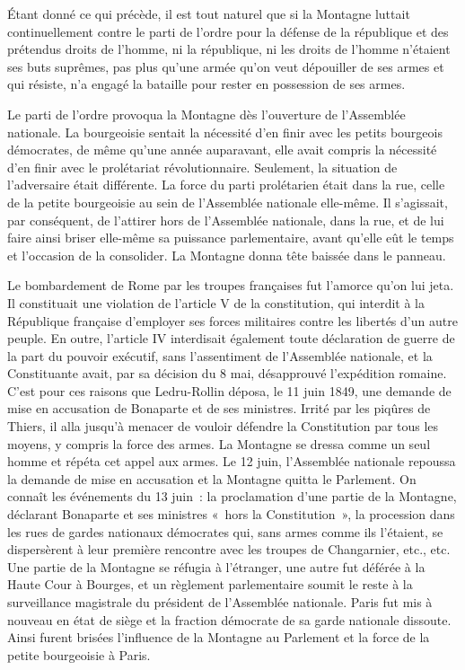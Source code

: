\documentclass[french,twoside]{book} %
\begin{document}
Étant donné ce qui précède, il est tout naturel que si la Montagne luttait continuellement contre le parti de l’ordre pour la défense de la république et des prétendus droits de l’homme, ni la république, ni les droits de l’homme n’étaient ses buts suprêmes, pas plus qu’une armée qu’on veut dépouiller de ses armes et qui résiste, n’a engagé la bataille pour rester en possession de ses armes.\par
Le parti de l’ordre provoqua la Montagne dès l’ouverture de l’Assemblée nationale. La bourgeoisie sentait la nécessité d’en finir avec les petits bourgeois démocrates, de même qu’une année auparavant, elle avait compris la nécessité d’en finir avec le prolétariat révolutionnaire. Seulement, la situation de l’adversaire était différente. La force du parti prolétarien était dans la rue, celle de la petite bourgeoisie au sein de l’Assemblée nationale elle-même. Il s’agissait, par conséquent, de l’attirer hors de l’Assemblée nationale, dans la rue, et de lui faire ainsi briser elle-même sa puissance parlementaire, avant qu’elle eût le temps et l’occasion de la consolider. La Montagne donna tête baissée dans le panneau.\par
Le bombardement de Rome par les troupes françaises fut l’amorce qu’on lui jeta. Il constituait une violation de l’article V de la constitution, qui interdit à la République française d’employer ses forces militaires contre les libertés d’un autre peuple. En outre, l’article IV interdisait également toute déclaration de guerre de la part du pouvoir exécutif, sans l’assentiment de l’Assemblée nationale, et la Constituante avait, par sa décision du 8 mai, désapprouvé l’expédition romaine. C’est pour ces raisons que Ledru-Rollin déposa, le 11 juin 1849, une demande de mise en accusation de Bonaparte et de ses ministres. Irrité par les piqûres de Thiers, il alla jusqu’à menacer de vouloir défendre la Constitution par tous les moyens, y compris la force des armes. La Montagne se dressa comme un seul homme et répéta cet appel aux armes. Le 12 juin, l’Assemblée nationale repoussa la demande de mise en accusation et la Montagne quitta le Parlement. On connaît les événements du 13 juin : la proclamation d’une partie de la Montagne, déclarant Bonaparte et ses ministres « hors la Constitution », la procession dans les rues de gardes nationaux démocrates qui, sans armes comme ils l’étaient, se dispersèrent à leur première rencontre avec les troupes de Changarnier, etc., etc. Une partie de la Montagne se réfugia à l’étranger, une autre fut déférée à la Haute Cour à Bourges, et un règlement parlementaire soumit le reste à la surveillance magistrale du président de l’Assemblée nationale. Paris fut mis à nouveau en état de siège et la fraction démocrate de sa garde nationale dissoute. Ainsi furent brisées l’influence de la Montagne au Parlement et la force de la petite bourgeoisie à Paris.\par
\end{document}
